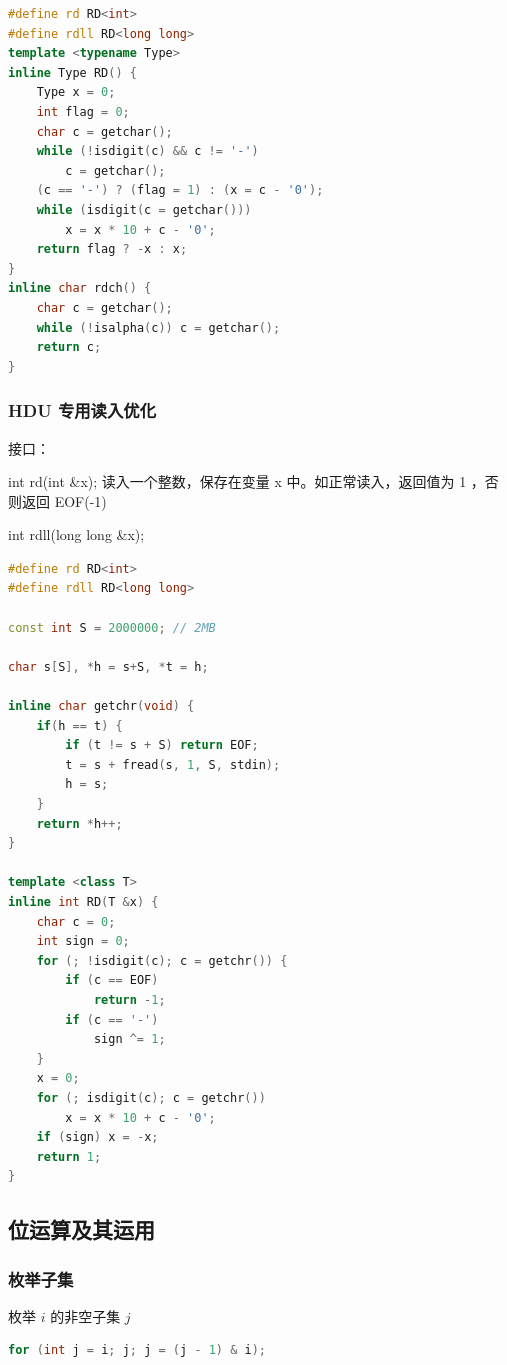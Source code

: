 \documentclass{article}
\begin{document}
\begin{lstlisting}[language=C++]
#define rd RD<int>
#define rdll RD<long long>
template <typename Type>
inline Type RD() {
    Type x = 0;
    int flag = 0;
    char c = getchar();
    while (!isdigit(c) && c != '-')
        c = getchar();
    (c == '-') ? (flag = 1) : (x = c - '0');
    while (isdigit(c = getchar()))
        x = x * 10 + c - '0';
    return flag ? -x : x;
}
inline char rdch() {
    char c = getchar();
    while (!isalpha(c)) c = getchar();
    return c;
}
\end{lstlisting}

\subsubsection{HDU 专用读入优化}

接口：

int rd(int \&x); 读入一个整数，保存在变量 x 中。如正常读入，返回值为 1 ，否则返回 EOF(-1)

int rdll(long long \&x);

\begin{lstlisting}[language=C++]
#define rd RD<int>
#define rdll RD<long long>

const int S = 2000000; // 2MB

char s[S], *h = s+S, *t = h;

inline char getchr(void) {
	if(h == t) {
		if (t != s + S) return EOF;
		t = s + fread(s, 1, S, stdin);
		h = s;
	}
	return *h++;
}

template <class T>
inline int RD(T &x) {
	char c = 0;
	int sign = 0;
	for (; !isdigit(c); c = getchr()) {
		if (c == EOF)
			return -1;
		if (c == '-')
			sign ^= 1;
	}
	x = 0;
	for (; isdigit(c); c = getchr())
		x = x * 10 + c - '0';
	if (sign) x = -x;
	return 1;
}
\end{lstlisting}

\subsection{位运算及其运用}

\subsubsection{枚举子集}

枚举 $i$ 的非空子集 $j$

\begin{lstlisting}[language=C++]
for (int j = i; j; j = (j - 1) & i);
\end{lstlisting}
\end{document}
